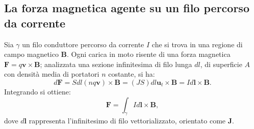 \documentclass[a4paper,11pt]{report}
\begin{document}
\subsection{La forza magnetica agente su un filo percorso da corrente}
Sia $\gamma$ un filo conduttore percorso da corrente $I$ che si trova in una regione di campo magnetico $\bm{B}$. Ogni carica in moto risente di una forza magnetica $\bm{F} = q\bm{v} \times \bm{B}$; analizzata una sezione infinitesima di filo lunga $dl$, di superficie $A$ con densità media di portatori $n$ costante, si ha:
\begin{equation}
d\bm{F} =  S dl (nq\bm{v}) \times \bm{B} = (JS) dl \bm{u}_t \times \bm{B} = I d\bm{l}\times \bm{B}.
\end{equation} 
Integrando si ottiene:
\begin{equation}
\bm{F} =  \int_\gamma I d\bm{l}\times \bm{B},
\end{equation} 
dove $d\bm{l}$ rappresenta l'infinitesimo di filo vettorializzato, orientato come $\bm{J}$.
\end{document}
